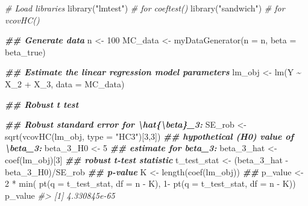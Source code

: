 \documentclass[
  14pt,
]{memoir}
\newenvironment{Shaded}{\begin{snugshade}}{\end{snugshade}}
\newcommand{\AttributeTok}[1]{\textcolor[rgb]{0.77,0.63,0.00}{#1}}
\newcommand{\CommentTok}[1]{\textcolor[rgb]{0.56,0.35,0.01}{\textit{#1}}}
\newcommand{\DecValTok}[1]{\textcolor[rgb]{0.00,0.00,0.81}{#1}}
\newcommand{\DocumentationTok}[1]{\textcolor[rgb]{0.56,0.35,0.01}{\textbf{\textit{#1}}}}
\newcommand{\FunctionTok}[1]{\textcolor[rgb]{0.00,0.00,0.00}{#1}}
\newcommand{\NormalTok}[1]{#1}
\newcommand{\OtherTok}[1]{\textcolor[rgb]{0.56,0.35,0.01}{#1}}
\newcommand{\SpecialCharTok}[1]{\textcolor[rgb]{0.00,0.00,0.00}{#1}}
\newcommand{\StringTok}[1]{\textcolor[rgb]{0.31,0.60,0.02}{#1}}
\begin{document}
\begin{Shaded}
\begin{Highlighting}[]
\CommentTok{\# Load libraries}
\FunctionTok{library}\NormalTok{(}\StringTok{"lmtest"}\NormalTok{)   }\CommentTok{\# for coeftest()}
\FunctionTok{library}\NormalTok{(}\StringTok{"sandwich"}\NormalTok{) }\CommentTok{\# for vcovHC()}

\DocumentationTok{\#\# Generate data}
\NormalTok{n }\OtherTok{\textless{}{-}} \DecValTok{100}
\NormalTok{MC\_data }\OtherTok{\textless{}{-}} \FunctionTok{myDataGenerator}\NormalTok{(}\AttributeTok{n    =}\NormalTok{ n, }
                           \AttributeTok{beta =}\NormalTok{ beta\_true)}

\DocumentationTok{\#\# Estimate the linear regression model parameters}
\NormalTok{lm\_obj }\OtherTok{\textless{}{-}} \FunctionTok{lm}\NormalTok{(Y }\SpecialCharTok{\textasciitilde{}}\NormalTok{ X\_2 }\SpecialCharTok{+}\NormalTok{ X\_3, }\AttributeTok{data =}\NormalTok{ MC\_data)}

\DocumentationTok{\#\# Robust t test}

\DocumentationTok{\#\# Robust standard error for \textbackslash{}hat\{\textbackslash{}beta\}\_3:}
\NormalTok{SE\_rob }\OtherTok{\textless{}{-}} \FunctionTok{sqrt}\NormalTok{(}\FunctionTok{vcovHC}\NormalTok{(lm\_obj, }\AttributeTok{type =} \StringTok{"HC3"}\NormalTok{)[}\DecValTok{3}\NormalTok{,}\DecValTok{3}\NormalTok{])}
\DocumentationTok{\#\# hypothetical (H0) value of \textbackslash{}beta\_3:}
\NormalTok{beta\_3\_H0 }\OtherTok{\textless{}{-}} \DecValTok{5}
\DocumentationTok{\#\# estimate for beta\_3:}
\NormalTok{beta\_3\_hat }\OtherTok{\textless{}{-}} \FunctionTok{coef}\NormalTok{(lm\_obj)[}\DecValTok{3}\NormalTok{]}
\DocumentationTok{\#\# robust t{-}test statistic}
\NormalTok{t\_test\_stat }\OtherTok{\textless{}{-}}\NormalTok{ (beta\_3\_hat }\SpecialCharTok{{-}}\NormalTok{ beta\_3\_H0)}\SpecialCharTok{/}\NormalTok{SE\_rob}
\DocumentationTok{\#\# p{-}value}
\NormalTok{K }\OtherTok{\textless{}{-}} \FunctionTok{length}\NormalTok{(}\FunctionTok{coef}\NormalTok{(lm\_obj))}
\DocumentationTok{\#\#}
\NormalTok{p\_value }\OtherTok{\textless{}{-}} \DecValTok{2} \SpecialCharTok{*} \FunctionTok{min}\NormalTok{(   }\FunctionTok{pt}\NormalTok{(}\AttributeTok{q =}\NormalTok{ t\_test\_stat, }\AttributeTok{df =}\NormalTok{ n }\SpecialCharTok{{-}}\NormalTok{ K), }
                   \DecValTok{1}\SpecialCharTok{{-}} \FunctionTok{pt}\NormalTok{(}\AttributeTok{q =}\NormalTok{ t\_test\_stat, }\AttributeTok{df =}\NormalTok{ n }\SpecialCharTok{{-}}\NormalTok{ K))}
\NormalTok{p\_value}
\CommentTok{\#\textgreater{} [1] 4.330845e{-}65}
\end{Highlighting}
\end{Shaded}
\end{document}
